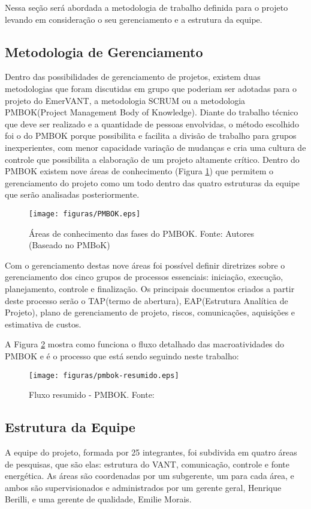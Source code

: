 Nessa seção será abordada a metodologia de trabalho definida para o projeto levando em consideração o seu gerenciamento e a estrutura da equipe.
\subsection{Metodologia de Gerenciamento}

Dentro das possibilidades de gerenciamento de projetos, existem duas metodologias que foram discutidas em grupo que poderiam ser adotadas para o projeto do EmerVANT, a metodologia SCRUM ou a metodologia PMBOK(Project Management Body of Knowledge). Diante do trabalho técnico que deve ser realizado e a quantidade de pessoas envolvidas, o método escolhido foi o do PMBOK porque possibilita e facilita a divisão de trabalho para grupos inexperientes, com menor capacidade variação de mudanças e cria uma cultura de controle que possibilita a elaboração de um projeto altamente crítico. Dentro do PMBOK existem nove áreas de conhecimento (Figura \ref{fig:metodologia}) que permitem o gerenciamento do projeto como um todo dentro das quatro estruturas da equipe que serão analisadas posteriormente.
 \begin{figure}[H]
	\centering
	  \texttt{[image: figuras/PMBOK.eps]}
	\caption[Áreas de conhecimento das fases do PMBOK]{Áreas de conhecimento das fases do PMBOK. Fonte: Autores (Baseado no PMBoK)}
	\label{fig:metodologia}
\end{figure}

Com o gerenciamento destas nove áreas foi possível definir diretrizes sobre o gerenciamento dos cinco grupos de processos essenciais: iniciação, execução, planejamento, controle e finalização. Os principais documentos criados a partir deste processo serão o TAP(termo de abertura), EAP(Estrutura Analítica de Projeto), plano de gerenciamento de projeto, riscos, comunicações, aquisições e estimativa de custos.

A Figura \ref{fig:pmbok} mostra como funciona o fluxo detalhado das macroatividades do PMBOK e é o processo que está sendo seguindo neste trabalho:

\begin{figure}[H]
		\texttt{[image: figuras/pmbok-resumido.eps]}
	\caption[Fluxo resumido - PMBOK]{Fluxo resumido - PMBOK. Fonte: \cite{pmbok}}
	\label{fig:pmbok}
\end{figure}

\subsection{Estrutura da Equipe}
A equipe do projeto, formada por 25 integrantes, foi subdivida em quatro áreas de pesquisas, que são elas: estrutura do VANT, comunicação, controle e fonte energética. As áreas são coordenadas por um subgerente, um para cada área, e ambos são supervisionados e administrados por um gerente geral, Henrique Berilli, e uma gerente de qualidade, Emilie Morais.

